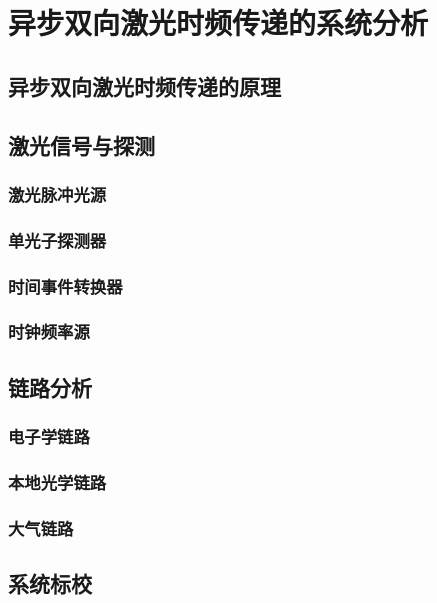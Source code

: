 \chapter{异步双向激光时频传递的系统分析}

\section{异步双向激光时频传递的原理}

\section{激光信号与探测}
\subsection{激光脉冲光源}
\subsection{单光子探测器}
\subsection{时间事件转换器}
\subsection{时钟频率源}

\section{链路分析}
\subsection{电子学链路}
\subsection{本地光学链路}
\subsection{大气链路}

\section{系统标校}
